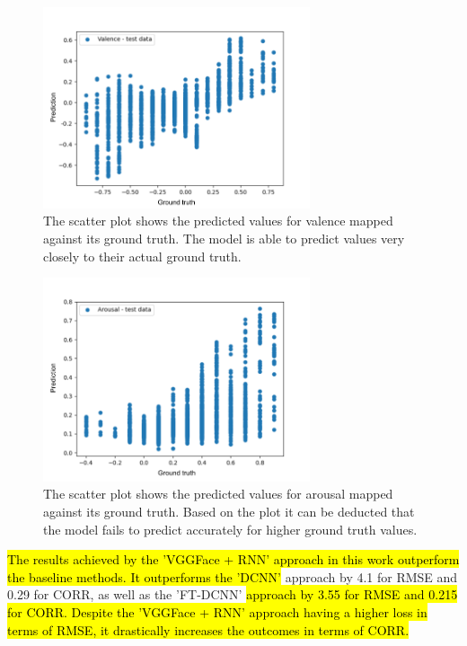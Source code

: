 \begin{figure}[htbp]
  \centering
  \includegraphics[width=0.7\textwidth]{Figures/ScatterPlot_Valence.png}
  \caption[Scatter plot for valence with the proposed approach]{The scatter plot shows the predicted values for valence mapped against its ground truth. The model is able to predict values very closely to their actual ground truth.}
  \label{fig:ScatterPlotValence}
\end{figure}

\begin{figure}[htbp]
  \centering
  \includegraphics[width=0.7\textwidth]{Figures/ScatterPlot_Arousal.png}
  \caption[Scatter plot for arousal with the proposed approach]{The scatter plot shows the predicted values for arousal mapped against its ground truth. Based on the plot it can be deducted that the model fails to predict accurately for higher ground truth values.}
  \label{fig:ScatterPlotArousal}
\end{figure}

\hl{The results achieved by the 'VGGFace + RNN' approach in this work outperform the baseline methods. It outperforms the 'DCNN'} \citep{Kossaifi:2017:AFEW-VADatabase} approach by 4.1 for RMSE and 0.29 for CORR, as well as the 'FT-DCNN' \citep{Kossaifi:2017:AFEW-VADatabase} \hl{approach by 3.55 for RMSE and 0.215 for CORR. Despite the 'VGGFace + RNN' approach having a higher loss in terms of RMSE, it drastically increases the outcomes in terms of CORR.}

